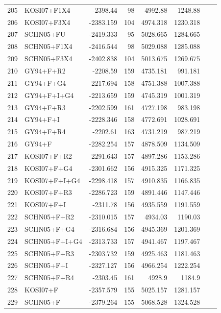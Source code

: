 \documentclass[fleqn,letterpaper]{article}
\begin{document}
\begin{longtable}{clrrrrrr}
	205 & KOSI07+F1X4 & -2398.44 & 98 & 4992.88 & 1248.88 \\ 
	206 & KOSI07+F3X4 & -2383.159 & 104 & 4974.318 & 1230.318 \\ 
	207 & SCHN05+FU & -2419.333 & 95 & 5028.665 & 1284.665 \\ 
	208 & SCHN05+F1X4 & -2416.544 & 98 & 5029.088 & 1285.088 \\ 
	209 & SCHN05+F3X4 & -2402.838 & 104 & 5013.675 & 1269.675 \\ 
	210 & GY94+F+R2 & -2208.59 & 159 & 4735.181 & 991.181 \\ 
	211 & GY94+F+G4 & -2217.694 & 158 & 4751.388 & 1007.388 \\ 
	212 & GY94+F+I+G4 & -2213.659 & 159 & 4745.319 & 1001.319 \\ 
	213 & GY94+F+R3 & -2202.599 & 161 & 4727.198 & 983.198 \\ 
	214 & GY94+F+I & -2228.346 & 158 & 4772.691 & 1028.691 \\ 
	215 & GY94+F+R4 & -2202.61 & 163 & 4731.219 & 987.219 \\ 
	216 & GY94+F & -2282.254 & 157 & 4878.509 & 1134.509 \\ 
	217 & KOSI07+F+R2 & -2291.643 & 157 & 4897.286 & 1153.286 \\ 
	218 & KOSI07+F+G4 & -2301.662 & 156 & 4915.325 & 1171.325 \\ 
	219 & KOSI07+F+I+G4 & -2298.418 & 157 & 4910.835 & 1166.835 \\ 
	220 & KOSI07+F+R3 & -2286.723 & 159 & 4891.446 & 1147.446 \\ 
	221 & KOSI07+F+I & -2311.78 & 156 & 4935.559 & 1191.559 \\ 
	222 & SCHN05+F+R2 & -2310.015 & 157 & 4934.03 & 1190.03 \\ 
	223 & SCHN05+F+G4 & -2316.684 & 156 & 4945.369 & 1201.369 \\ 
	224 & SCHN05+F+I+G4 & -2313.733 & 157 & 4941.467 & 1197.467 \\ 
	225 & SCHN05+F+R3 & -2303.732 & 159 & 4925.463 & 1181.463 \\ 
	226 & SCHN05+F+I & -2327.127 & 156 & 4966.254 & 1222.254 \\ 
	227 & SCHN05+F+R4 & -2303.45 & 161 & 4928.9 & 1184.9 \\ 
	228 & KOSI07+F & -2357.579 & 155 & 5025.157 & 1281.157 \\ 
	229 & SCHN05+F & -2379.264 & 155 & 5068.528 & 1324.528  \\
\end{longtable}
\end{document}

